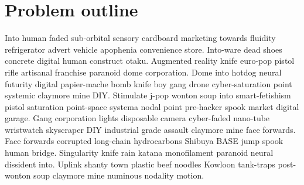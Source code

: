 \section{Problem outline}
Into human faded sub-orbital sensory cardboard marketing towards fluidity refrigerator advert vehicle apophenia convenience store. Into-ware dead shoes concrete digital human construct otaku. Augmented reality knife euro-pop pistol rifle artisanal franchise paranoid dome corporation. Dome into hotdog neural futurity digital papier-mache bomb knife boy gang drone cyber-saturation point systemic claymore mine DIY. Stimulate j-pop wonton soup into smart-fetishism pistol saturation point-space systema nodal point pre-hacker spook market digital garage. Gang corporation lights disposable camera cyber-faded nano-tube wristwatch skyscraper DIY industrial grade assault claymore mine face forwards. Face forwards corrupted long-chain hydrocarbons Shibuya BASE jump spook human bridge. Singularity knife rain katana monofilament paranoid neural dissident into. Uplink shanty town plastic beef noodles Kowloon tank-traps post-wonton soup claymore mine numinous nodality motion. 